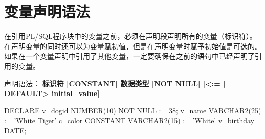 \documentclass[11pt, a4paper, oneside, UTF8]{ctexbook}
\let\kaishu\relax %
\begin{document}
\section{变量声明语法}
在引用PL/SQL程序块中的变量之前，必须在声明段声明所有的变量（标识符）。
在声明变量的同时还可以为变量赋初值，但是在声明变量时赋予初始值是可选的。
如果在一个变量声明中引用了其他变量，一定要确保在之前的语句中已经声明了引用的变量。

声明语法：
{\bfseries\kaishu 标识符 [CONSTANT] 数据类型 [NOT NULL] [<:= | DEFAULT> initial\_value]}

\begin{plsql}[caption=PL/SQL变量声明语法示例]
DECLARE
  v_dogid NUMBER(10) NOT NULL := 38;
  v_name VARCHAR2(25) := 'White Tiger'
  c_color CONSTANT VARCHAR2(15) := 'White'
  v_birthday DATE;
\end{plsql}
\end{document}
